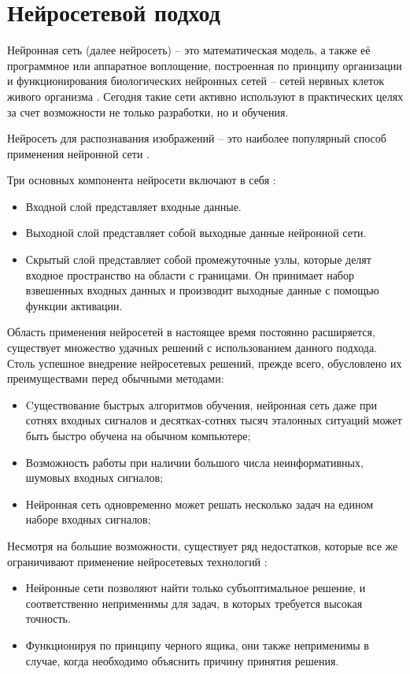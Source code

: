 \chapter{Нейросетевой подход}

Нейронная сеть (далее нейросеть) – это математическая модель, а также её программное или аппаратное воплощение, построенная по принципу организации и функционирования биологических нейронных сетей – сетей нервных клеток живого организма \cite{neronnetwork4}. Сегодня такие сети активно используют в практических целях за счет возможности не только разработки, но и обучения. 

Нейросеть для распознавания изображений – это наиболее популярный способ применения нейронной сети \cite{neronnetwork3}.

Три основных компонента нейросети включают в себя \cite{neronnetwork5}:
\begin{itemize}
	\item Входной слой представляет входные данные.
	\item Выходной слой представляет собой выходные данные нейронной сети.
	\item Скрытый слой представляет собой промежуточные узлы, которые делят входное пространство на области с границами. Он принимает набор взвешенных входных данных и производит выходные данные с помощью функции активации.
\end{itemize}

Область применения нейросетей в настоящее время постоянно расширяется, существует множество удачных решений с использованием данного подхода. Столь успешное внедрение нейросетевых решений, прежде всего, обусловлено их преимуществами перед обычными методами\cite{neronnetwork, neronnetwork7}:

\begin{itemize}
	\item Cуществование быстрых алгоритмов обучения, нейронная сеть даже при сотнях входных сигналов и десятках-сотнях тысяч эталонных ситуаций может быть быстро обучена на обычном компьютере;
	\item Возможность работы при наличии большого числа неинформативных, шумовых входных сигналов;
	\item Нейронная сеть одновременно может решать несколько задач на едином наборе входных сигналов;
\end{itemize} 

Несмотря на большие возможности, существует ряд недостатков, которые все же ограничивают применение нейросетевых технологий \cite{neronnetwork8}:
\begin{itemize}
	\item Нейронные сети позволяют найти только субъоптимальное решение, и соответственно неприменимы для задач, в которых требуется высокая точность.
	\item Функционируя по принципу черного ящика, они также неприменимы в случае, когда необходимо объяснить причину принятия решения.
\end{itemize} 

